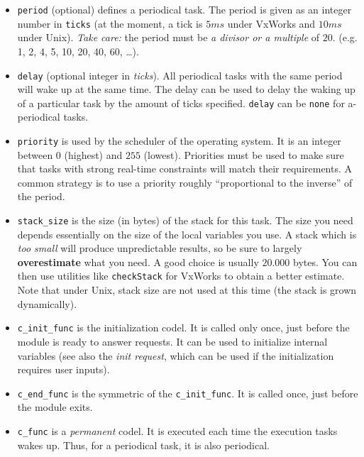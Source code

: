 \begin{itemize}
\item {\tt period} (optional) defines a periodical task. The period is
given as an integer number in {\tt ticks} (at the moment, a tick is $5ms$
under VxWorks and $10ms$ under Unix). {\em Take care:} the period must be
{\em a divisor or a multiple} of $20$. (e.g. 1, 2, 4, 5, 10, 20, 40, 60,
\ldots). 

\item {\tt delay} (optional integer in {\em ticks}). All periodical
tasks with the same period  will wake up at the  same time. The delay can
be used to delay the waking up of a particular task  by the amount of ticks
specified. {\tt delay} can be {\tt none} for  a-periodical tasks.

\item {\tt priority} is used by the scheduler of the operating system. It
is an integer  between $0$ (highest) and  $255$ (lowest). Priorities must
be used to make  sure that tasks  with strong real-time constraints  will
match their requirements.  A common strategy is to use a priority roughly
``proportional to the inverse'' of the period.

\item {\tt stack\_size} is the size (in bytes) of the stack for this
task. The size you  need  depends essentially on   the size of the  local
variables you  use.  A   stack which  is {\em   too small} will   produce
unpredictable results, so be sure  to largely {\bf overestimate} what you
need.   A  good choice is  usually   $20.000$  bytes.  You can  then  use
utilities   like {\tt checkStack}     for  VxWorks to   obtain a   better
estimate. Note that under Unix, stack size are not used at this time (the
stack is grown dynamically).

\item {\tt c\_init\_func} is the initialization codel. It is called only
once, just before the module is ready to answer requests.  It can be used
to initialize internal variables (see also  the {\em init request}, which
can be used if the initialization requires user inputs).

\item {\tt c\_end\_func} is the symmetric of the {\tt c\_init\_func}. It
is called once, just before the module exits.

\item {\tt c\_func} is a {\em permanent} codel. It is executed each time
the execution tasks wakes  up. Thus, for  a  periodical task, it is  also
periodical.


\end{itemize}

